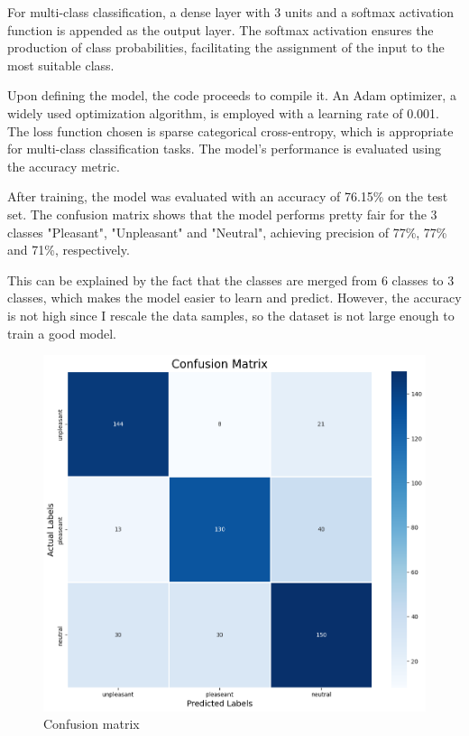 For multi-class classification, a dense layer with 3 units and a softmax activation function is appended as the output layer. The softmax activation ensures the production of class probabilities, facilitating the assignment of the input to the most suitable class.

Upon defining the model, the code proceeds to compile it. An Adam optimizer, a widely used optimization algorithm, is employed with a learning rate of 0.001. The loss function chosen is sparse categorical cross-entropy, which is appropriate for multi-class classification tasks. The model's performance is evaluated using the accuracy metric.

After training, the model was evaluated with an accuracy of 76.15\% on the test set.
The confusion matrix shows that the model performs pretty fair for the 3 classes "Pleasant", "Unpleasant" and "Neutral", achieving precision of 77\%, 77\% and 71\%, respectively. 

This can be explained by the fact that the classes are merged from 6 classes to 3 classes, which makes the model easier to learn and predict. However, the accuracy is not high since I rescale the data samples, so the dataset is not large enough to train a good model.
    
\begin{center}
    \begin{figure}[!htp]
        \centering
        \includegraphics[width=0.8 \textwidth]{image/confusion_matrix.png}
        \caption{Confusion matrix}
        \label{subsection}
    \end{figure}
    \end{center}

